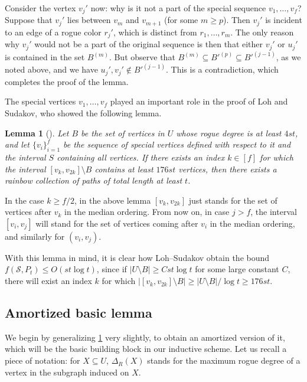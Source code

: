 \documentclass[a4paper,11pt]{article}
\makeatletter
\renewenvironment{proof}[1][\proofname] {\par\pushQED{\qed}\normalfont\topsep6\p@\@plus6\p@\relax\trivlist\item[\hskip\labelsep\bfseries#1\@addpunct{.}]\ignorespaces}{\popQED\endtrivlist\@endpefalse}
\newtheorem{lemma}[theorem]{\bf Lemma}
\theoremstyle{definition}
\def\cS{\mathcal{S}}
\makeatother
\begin{document}
\begin{proof}
Consider the vertex $v_j'$ now: why is it not a part of the special sequence $v_1, \dots, v_f$? 
Suppose that $v_j'$ lies between $v_m$ and $v_{m+1}$ (for some $m \geq p$). Then $v_j'$ is incident to an edge of a rogue color $r_j'$, which is distinct from $r_1, \dots, r_m$. The only reason why $v_j'$ would not be a part of the original sequence is then that either $v_j'$ or $u_j'$ is contained in the set $B^{(m)}$. But observe that $B^{(m)}\subseteq B'^{(p)}\subseteq B'^{(j-1)}$, as we noted above, and we have $u_j', v_j'\notin B'^{(j-1)}$. This is a contradiction, which completes the proof of the lemma.
\end{proof}

The special vertices $v_1, \dots, v_f$ played an important role in the proof of Loh and Sudakov, who showed the following lemma.

\begin{lemma}[{\cite[Lemma 2.5]{LS09}}]\label{lemma:long I_k}
Let $B$ be the set of vertices in $U$ whose rogue degree is at least $4st$, and let $\{v_i\}_{i=1}^f$ be the sequence of special vertices defined with respect to it and the interval $S$ containing all vertices. If there exists an index $k\in [f]$ for which the interval $[v_{k}, v_{2k}]\setminus B$ contains at least $176st$ vertices, then there exists a rainbow collection of paths of total length at least $t$.
\end{lemma}

In the case $k\geq f/2$, in the above lemma $[v_k, v_{2k}]$ just stands for the set of vertices after $v_k$ in the median ordering. From now on, in case $j>f$, the interval $[v_i, v_j]$ will stand for the set of vertices coming after $v_i$ in the median ordering, and similarly for $(v_i,v_j)$.

With this lemma in mind, it is clear how Loh--Sudakov obtain the bound $f(\cS, P_t)\leq O(st\log t)$, since if $|U\setminus B|\geq Cst\log t$ for some large constant $C$, there will exist an index $k$ for which $|[v_k, v_{2k}]\setminus B|\geq |U\setminus B|/\log t\geq 176 st$. 

\subsection{Amortized basic lemma}

We begin by generalizing \cref{lemma:long I_k} very slightly, to obtain an amortized version of it, which will be the basic building block in our inductive scheme. Let us recall a piece of notation: for $X\subseteq U$, $\Delta_R(X)$ stands for the maximum rogue degree of a vertex in the subgraph induced on $X$. 
\end{document}
